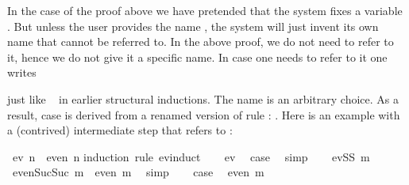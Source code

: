 \begin{isabellebody}
\begin{isamarkuptext}
In the case  of the proof above we have pretended that the
system fixes a variable .  But unless the user provides the name
, the system will just invent its own name that cannot be referred
to.  In the above proof, we do not need to refer to it, hence we do not give
it a specific name. In case one needs to refer to it one writes
\begin{quote}
 
\end{quote}
just like ~ in earlier structural inductions.
The name  is an arbitrary choice. As a result,
case  is derived from a renamed version of
rule : .
Here is an example with a (contrived) intermediate step that refers to :%
\end{isamarkuptext}%
\isamarkuptrue%
\isamarkupfalse%
\ {}ev\ n\ {}\ even\ n{}\isanewline
%
\isadelimproof
%
\endisadelimproof
%
\isatagproof
{}\isamarkupfalse%
{}induction\ rule{}\ ev{}induct{}\isanewline
\ \ \isamarkupfalse%
\ ev{}\ \isamarkupfalse%
\ {}case\ \isamarkupfalse%
\ simp\isanewline
{}\isamarkupfalse%
\isanewline
\ \ \isamarkupfalse%
\ {}evSS\ m{}\isanewline
\ \ \isamarkupfalse%
\ {}even{}Suc{}Suc\ m{}{}\ {}\ even\ m{}\ \isamarkupfalse%
\ simp\isanewline
\ \ \isamarkupfalse%
\ {}case\ \isamarkupfalse%
\ {}even\ m{}\ \isamarkupfalse%

\end{isabellebody}
